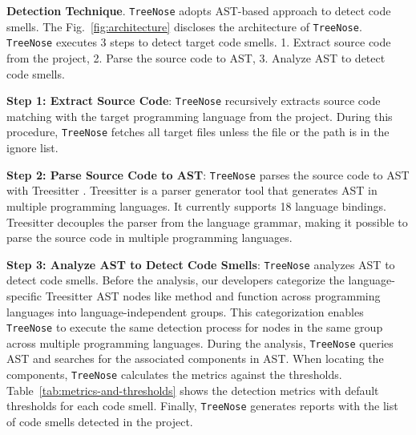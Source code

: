 {\bf Detection Technique}. \texttt{TreeNose} adopts AST-based approach to detect
code smells. The Fig.~\ref{fig:architecture} discloses the architecture of
\texttt{TreeNose}. \texttt{TreeNose} executes 3 steps to detect target code
smells. 1. Extract source code from the project, 2. Parse the source code to
AST, 3. Analyze AST to detect code smells.

\textbf{Step 1: Extract Source Code}: \texttt{TreeNose} recursively extracts
source code matching with the target programming language from the
project. During this procedure, \texttt{TreeNose} fetches all target files
unless the file or the path is in the ignore list.

\textbf{Step 2: Parse Source Code to AST}: \texttt{TreeNose} parses the source
code to AST with Treesitter \cite{treeSitter}. Treesitter is a parser generator
tool that generates AST in multiple programming languages. It currently
supports 18 language bindings. Treesitter decouples the parser from the
language grammar, making it possible to parse the source code in multiple
programming languages.

\textbf{Step 3: Analyze AST to Detect Code Smells}: \texttt{TreeNose} analyzes
AST to detect code smells. Before the analysis, our developers categorize the
language-specific Treesitter AST nodes like method and function across
programming languages into language-independent groups. This categorization
enables \texttt{TreeNose} to execute the same detection process for nodes in
the same group across multiple programming languages. During the analysis,
\texttt{TreeNose} queries AST and searches for the associated components in
AST. When locating the components, \texttt{TreeNose} calculates the metrics
against the thresholds. Table~\ref{tab:metrics-and-thresholds} shows the
detection metrics with default thresholds for each code smell. Finally,
\texttt{TreeNose} generates reports with the list of code smells detected in
the project.


